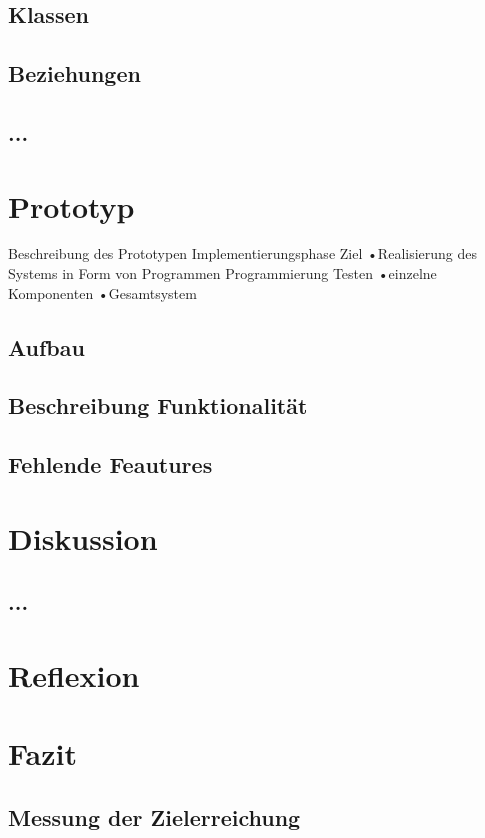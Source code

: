 \documentclass[12pt, titlepage]{article}
\begin{document}
\subsection{Klassen}
\subsection{Beziehungen}
\subsection{...}

\newpage
\section{Prototyp}
Beschreibung des Prototypen
Implementierungsphase
Ziel
•Realisierung des Systems in Form von Programmen
Programmierung
Testen
•einzelne Komponenten
•Gesamtsystem

\subsection{Aufbau}
\subsection{Beschreibung Funktionalität}
\subsection{Fehlende Feautures}

\newpage
\section{Diskussion}
\subsection{...}

\section{Reflexion}

\newpage
\section{Fazit}
\subsection{Messung der Zielerreichung}
\end{document}
